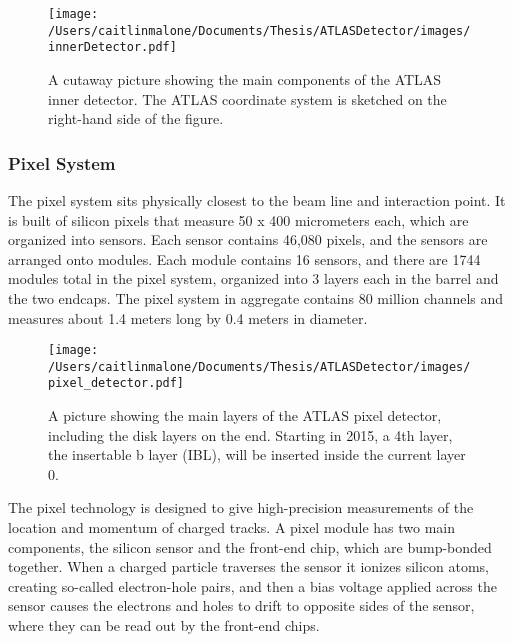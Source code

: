 \begin{figure}
	\texttt{[image: /Users/caitlinmalone/Documents/Thesis/ATLASDetector/images/innerDetector.pdf]}
	\label{fig:inner_detector}  
	\caption{A cutaway picture showing the main components of the ATLAS inner detector.  The ATLAS coordinate system is sketched on the right-hand side of the figure.}
\end{figure}


\subsubsection{Pixel System}
\label{sec:pixel}
The pixel system sits physically closest to the beam line and interaction point.  It is built of silicon pixels that measure 50 x 400 micrometers each, which are organized into sensors.  Each sensor contains 46,080 pixels, and the sensors are arranged onto modules.  Each module contains 16 sensors, and there are 1744 modules total in the pixel system, organized into 3 layers each in the barrel and the two endcaps.  The pixel system in aggregate contains 80 million channels and measures about 1.4 meters long by 0.4 meters in diameter.

\begin{figure}
	\texttt{[image: /Users/caitlinmalone/Documents/Thesis/ATLASDetector/images/pixel\_detector.pdf]} 
	\caption{A picture showing the main layers of the ATLAS pixel detector, including the disk layers on the end.  Starting in 2015, a 4th layer, the insertable b layer (IBL), will be inserted inside the current layer 0. 	\label{fig:inner_detector} }
\end{figure}

The pixel technology is designed to give high-precision measurements of the location and momentum of charged tracks.  A pixel module has two main components, the silicon sensor and the front-end chip, which are bump-bonded together.  When a charged particle traverses the sensor it ionizes silicon atoms, creating so-called electron-hole pairs, and then a bias voltage applied across the sensor causes the electrons and holes to drift to opposite sides of the sensor, where they can be read out by the front-end chips.  

